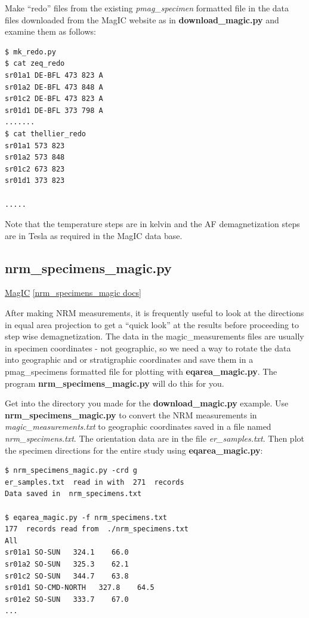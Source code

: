 \documentclass[11pt]{book}
\begin{document}
{{{{ Make ``redo'' files from the existing  {\it pmag\_specimen} formatted file in the data files downloaded from the MagIC website as in {\bf download\_magic.py} and examine them as follows:

\begin{verbatim}
$ mk_redo.py
$ cat zeq_redo
sr01a1 DE-BFL 473 823 A
sr01a2 DE-BFL 473 848 A
sr01c2 DE-BFL 473 823 A
sr01d1 DE-BFL 373 798 A
.......
$ cat thellier_redo
sr01a1 573 823
sr01a2 573 848
sr01c2 673 823
sr01d1 373 823

.....
\end{verbatim}

\noindent Note that the temperature steps are in kelvin and the AF demagnetization steps are in Tesla as required in the MagIC data base.



%

\subsection{nrm\_specimens\_magic.py}
\href{#MagIC}{MagIC}
\href{https://github.com/PmagPy/PmagPy/blob/master/programs/nrm_specimens_magic.py}{[nrm\_specimens\_magic docs]}

After making NRM measurements, it is frequently useful to look at the directions in equal area projection to get a ``quick look'' at the results before proceeding to step wise demagnetization.  The data in the magic\_measurements files are usually in specimen coordinates - not geographic, so we need a way to rotate the data into geographic and or stratigraphic coordinates and save them in a pmag\_specimens formatted file for plotting with {\bf eqarea\_magic.py}.   The program {\bf nrm\_specimens\_magic.py} will do this for you.

Get into the directory you made for the {\bf download\_magic.py} example.   \newline Use {\bf nrm\_specimens\_magic.py} to convert the NRM measurements in  {\it magic\_measurements.txt }   to geographic coordinates saved in a file named {\it nrm\_specimens.txt}.  The orientation data are in the file {\it er\_samples.txt}.    Then plot the specimen directions for the entire study using {\bf eqarea\_magic.py}:


 \begin{verbatim}
$ nrm_specimens_magic.py -crd g
er_samples.txt  read in with  271  records
Data saved in  nrm_specimens.txt

$ eqarea_magic.py -f nrm_specimens.txt
177  records read from  ./nrm_specimens.txt
All
sr01a1 SO-SUN   324.1    66.0
sr01a2 SO-SUN   325.3    62.1
sr01c2 SO-SUN   344.7    63.8
sr01d1 SO-CMD-NORTH   327.8    64.5
sr01e2 SO-SUN   333.7    67.0
...


\end{verbatim}}}}}
\end{document}
